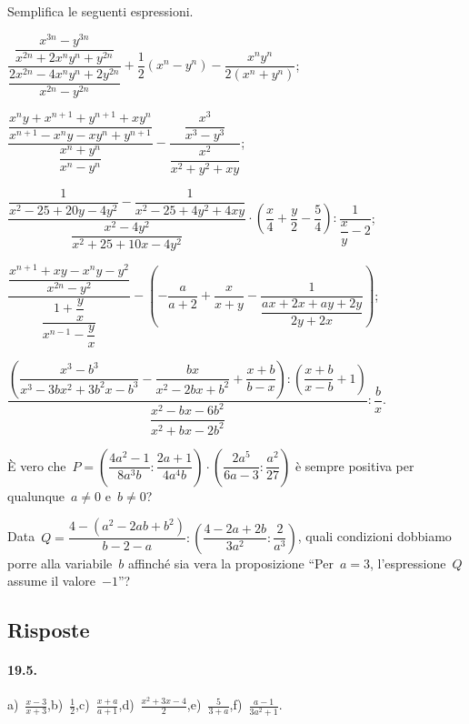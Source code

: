 \begin{esercizio}[\Ast]
Semplifica le seguenti espressioni.
\begin{enumeratea}
 \item $\dfrac{\dfrac{x^{3n}-y^{3n}}{x^{2n}+2x^{n}y^{n}+y^{2n}}}{\dfrac{2x^{2n}-4x^{n}y^{n}+2y^{2n}}{x^{2n}-y^{2n}}}+\dfrac{1}{2}\left(x^{n}-y^{n}\right)-\dfrac{x^{n}y^{n}}{2\left(x^{n}+y^{n}\right)}$;
 \item $\dfrac{\dfrac{x^{n}y+x^{n+1}+y^{n+1}+xy^{n}}{x^{n+1}-x^{n}y-xy^{n}+y^{n+1}}}{\dfrac{x^{n}+y^{n}}{x^{n}-y^{n}}}-\dfrac{\dfrac{x^{3}}{x^{3}-y^{3}}}{\dfrac{x^{2}}{x^{2}+y^{2}+xy}}$;
 \item $\dfrac{\dfrac{1}{x^{2}-25+20y-4y^{2}}-\dfrac{1}{x^{2}-25+4y^{2}+4xy}}{\dfrac{x^{2}-4y^{2}}{x^{2}+25+10x-4y^{2}}}\cdot \left(\dfrac{x}{4}+\dfrac{y}{2}-\dfrac{5}{4}\right):\dfrac{1}{\dfrac{x}{y}-2}$;
 \item $\dfrac{\dfrac{x^{n+1}+xy-x^{n}y-y^{2}}{x^{2n}-y^{2}}}{\dfrac{1+\dfrac{y}{x}}{x^{n-1}-\dfrac{y}{x}}}-\left(-{\dfrac{a}{a+2}}+\dfrac{x}{x+y}-\dfrac{1}{\dfrac{ax+2x+ay+2y}{2y+2x}}\right)$;
 \item $\dfrac{\left(\dfrac{x^{3}-b^{3}}{x^{3}-3bx^{2}+3b^{2}x-b^{3}}-\dfrac{bx}{x^{2}-2bx+b^{2}}+\dfrac{x+b}{b-x}\right):\left(\dfrac{x+b}{x-b}+1\right)}{\dfrac{x^{2}-bx-6b^{2}}{x^{2}+bx-2b^{2}}}:\dfrac{b}{x}$.
\end{enumeratea}
\end{esercizio}

\begin{esercizio}[\Ast]
È vero che~$P=\left(\dfrac{4a^{2}-1}{8a^{3}b}:\dfrac{2a+1}{4a^{4}b}\right)\cdot \left(\dfrac{2a^{5}}{6a-3}:\dfrac{a^{2}}{27}\right)$
è sempre positiva per qualunque~$a{\neq}0$ e~$b{\neq}0$?
\end{esercizio}

\begin{esercizio}[\Ast]
Data~$Q=\dfrac{4-\left(a^{2}-2ab+b^{2}\right)}{b-2-a}:\left(\dfrac{4-2a+2b}{3a^{2}}:\dfrac{2}{a^{3}}\right)$,
quali condizioni dobbiamo porre alla variabile~$b$ affinché sia vera la proposizione ``Per~$a = 3$, l’espressione~$Q$ assume il valore~$-1$''?
\end{esercizio}

\subsection{Risposte}

\paragraph{19.5.}
a)~$\frac{x-3}{x+3}$,\quad b)~$\frac{1}{2}$,\quad c)~$\frac{x+a}{a+1}$,\quad d)~$\frac{x^{2}+3x-4}{2}$,\quad e)~$\frac{5}{3+a}$,\quad f)~$\frac{a-1}{3a^{2}+1}$.

